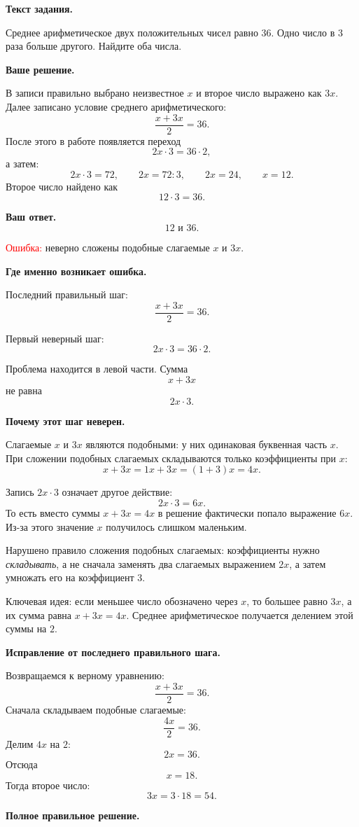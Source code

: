 \documentclass[12pt,a4paper]{article}
\begin{document}
\textbf{Текст задания.}

Среднее арифметическое двух положительных чисел равно $36$. Одно число в $3$ раза больше другого. Найдите оба числа.

\textbf{Ваше решение.}

В записи правильно выбрано неизвестное $x$ и второе число выражено как $3x$. Далее записано условие среднего арифметического:
\[
\frac{x+3x}{2}=36.
\]
После этого в работе появляется переход
\[
2x\cdot3=36\cdot2,
\]
а затем:
\[
2x\cdot3=72,
\qquad
2x=72:3,
\qquad
2x=24,
\qquad
x=12.
\]
Второе число найдено как
\[
12\cdot3=36.
\]

\textbf{Ваш ответ.}
\[
12 \text{ и } 36.
\]

\textcolor{red}{Ошибка:} неверно сложены подобные слагаемые $x$ и $3x$.

\textbf{Где именно возникает ошибка.}

Последний правильный шаг:
\[
\frac{x+3x}{2}=36.
\]

Первый неверный шаг:
\[
2x\cdot3=36\cdot2.
\]

Проблема находится в левой части. Сумма
\[
x+3x
\]
не равна
\[
2x\cdot3.
\]

\textbf{Почему этот шаг неверен.}

Слагаемые $x$ и $3x$ являются подобными: у них одинаковая буквенная часть $x$. При сложении подобных слагаемых складываются только коэффициенты при $x$:
\[
x+3x=1x+3x=(1+3)x=4x.
\]

Запись $2x\cdot3$ означает другое действие:
\[
2x\cdot3=6x.
\]
То есть вместо суммы $x+3x=4x$ в решение фактически попало выражение $6x$. Из-за этого значение $x$ получилось слишком маленьким.

Нарушено правило сложения подобных слагаемых: коэффициенты нужно \emph{складывать}, а не сначала заменять два слагаемых выражением $2x$, а затем умножать его на коэффициент $3$.

\textcolor{blue!60!black}{Ключевая идея:} если меньшее число обозначено через $x$, то большее равно $3x$, а их сумма равна $x+3x=4x$. Среднее арифметическое получается делением этой суммы на $2$.

\textbf{Исправление от последнего правильного шага.}

Возвращаемся к верному уравнению:
\[
\frac{x+3x}{2}=36.
\]
Сначала складываем подобные слагаемые:
\[
\frac{4x}{2}=36.
\]
Делим $4x$ на $2$:
\[
2x=36.
\]
Отсюда
\[
x=18.
\]
Тогда второе число:
\[
3x=3\cdot18=54.
\]

\textbf{Полное правильное решение.}
\end{document}
